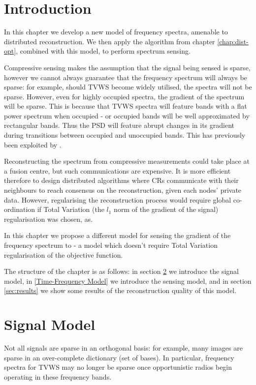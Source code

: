\section{Introduction}

In this chapter we develop a new model of frequency spectra, amenable to distributed reconstruction. We then apply the algorithm from chapter \ref{chap:dist-opt}, combined with this model, to perform spectrum sensing.

Compressive sensing makes the assumption that the signal being sensed is sparse, however we cannot always guarantee that the frequency spectrum will always be sparse: for example, should TVWS become widely utilised, the spectra will not be sparse. However, even for highly occupied spectra, the gradient of the spectrum will be sparse. This is because that TVWS spectra will feature bands with a flat power spectrum when occupied - or occupied bands will be well approximated by rectangular bands. Thus the PSD will feature abrupt changes in its gradient during transitions between occupied and unoccupied bands. This has previously been exploited by \cite{tian2006wavelet}. 

Reconstructing the spectrum from compressive measurements could take place at a fusion centre, but such communications are expensive. It is more efficient therefore to design distributed algorithms where CRs communicate with their neighbours to reach consensus on the reconstruction, given each nodes' private data. However, regularising the reconstruction process would require global co-ordination if Total Variation (the \(l_1\) norm of the gradient of the signal) regularisation was chosen, as.

In this chapter we propose a different model for sensing the gradient of the frequency spectrum to \cite{tian2006wavelet} - a model which doesn't require Total Variation regularisation of the objective function. 

The structure of the chapter is as follows: in section \ref{sec:sig-model} we introduce the signal model, in \ref{Time-Frequency Model} we introduce the sensing model, and in section \ref{sec:results} we show some results of the reconstruction quality of this model. 

\section{Signal Model}\label{sec:sig-model}

Not all signals are sparse in an orthogonal basis: for example, many images are sparse in an over-complete dictionary (set of bases). In particular, frequency spectra for TVWS may no longer be sparse once opportunistic radios begin operating in these frequency bands. 


